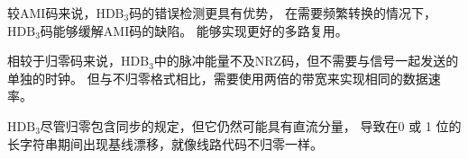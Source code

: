 \documentclass[AutoFakeBold]{LZUThesis}
\begin{document}
较AMI码来说，$\mathrm{HDB_3}$码的错误检测更具有优势，
在需要频繁转换的情况下，$\mathrm{HDB_3}$码能够缓解AMI码的缺陷。
能够实现更好的多路复用。

相较于归零码来说，$\mathrm{HDB_3}$中的脉冲能量不及NRZ码，但不需要与信号一起发送的单独的时钟。
但与不归零格式相比，需要使用两倍的带宽来实现相同的数据速率。

$\mathrm{HDB_3}$尽管归零包含同步的规定，但它仍然可能具有直流分量，
导致在0 或 1 位的长字符串期间出现基线漂移，就像线路代码不归零一样。



\backmatter


\printbib
\nocite{*} %




\end{document}
